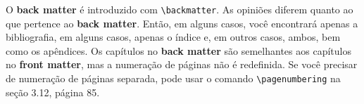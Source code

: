 O \textbf{back matter} é introduzido com \verb|\backmatter|. As opiniões diferem quanto ao que pertence ao \textbf{back matter}. Então, em alguns casos, você encontrará apenas a bibliografia, em alguns casos, apenas o índice e, em outros casos, ambos, bem como os apêndices. Os capítulos no\textbf{ back matter} são semelhantes aos capítulos no\textbf{ front matter}, mas a numeração de páginas não é redefinida. Se você precisar de numeração de páginas separada, pode usar o comando \verb|\pagenumbering| na seção 3.12, página 85.
